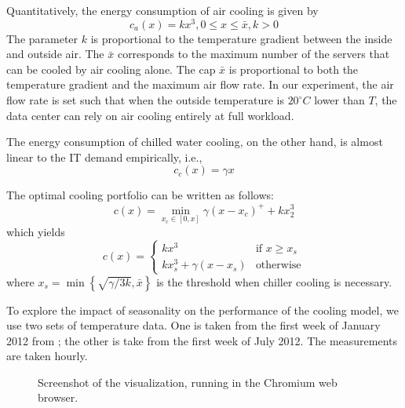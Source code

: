 \documentclass{acm_proc_article-sp}
\begin{document}
Quantitatively, the energy consumption of air cooling is given by 
\begin{equation}
c_a(x) = kx^3, 0 \leq x \leq \bar{x}, k > 0
\end{equation}
The parameter $k$ is proportional to the temperature gradient between the inside and outside air. The $\bar{x}$ corresponds to the maximum number of the servers that can be cooled by air cooling alone. The cap $\bar{x}$ is proportional to both the temperature gradient and the maximum air flow rate. In our experiment, the air flow rate is set such that when the outside temperature is $20^{\circ}C$ lower than $T$, the data center can rely on air cooling entirely at full workload.

The energy consumption of chilled water cooling, on the other hand, is almost linear to the IT demand empirically, i.e.,
\begin{equation}
c_c(x) = \gamma x
\end{equation}

The optimal cooling portfolio can be written as follows:
\begin{equation}
c(x) =  \min_{x_c \in [0,x]} \gamma(x-x_c)^+ + kx_2^3
\end{equation}
which yields
$$
c(x) = \left\{ \begin{array}{ll}
         kx^3 & \mbox{if $x \geq x_s$}\\
        kx_s^3 + \gamma (x-x_s) & \mbox{otherwise}\end{array} \right.
$$
where $x_s = \min \left\{\sqrt{\gamma/3k}, \bar{x}\right\}$ is the threshold when chiller cooling is necessary.

To explore the impact of seasonality on the performance of the cooling model, we use two sets of temperature data. One is taken from the first week of January 2012 from \cite{temp}; the other is take from the first week of July 2012. The measurements are taken hourly.

\begin{figure*}
\centering
{}
\caption{Screenshot of the visualization, running in the Chromium web browser.}
\end{figure*}
\end{document}
